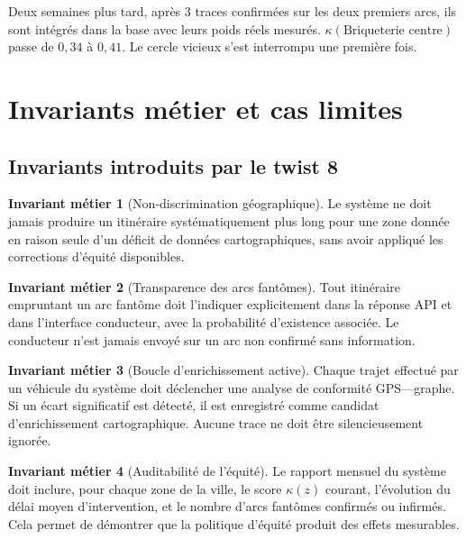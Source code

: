 \documentclass[12pt,a4paper]{article}
\theoremstyle{definition}
\newtheorem{invariant}{Invariant métier}[section]
\theoremstyle{remark}
\begin{document}
Deux semaines plus tard, après 3 traces confirmées sur les deux premiers
arcs, ils sont intégrés dans la base avec leurs poids réels mesurés.
$\kappa(\text{Briqueterie centre})$ passe de $0{,}34$ à $0{,}41$.
Le cercle vicieux s'est interrompu une première fois.

\newpage

\section{Invariants métier et cas limites}

\subsection{Invariants introduits par le twist 8}

\begin{invariant}[Non-discrimination géographique]
Le système ne doit jamais produire un itinéraire systématiquement
plus long pour une zone donnée en raison seule d'un déficit de
données cartographiques, sans avoir appliqué les corrections d'équité
disponibles.
\end{invariant}

\begin{invariant}[Transparence des arcs fantômes]
Tout itinéraire empruntant un arc fantôme doit l'indiquer
explicitement dans la réponse API et dans l'interface conducteur,
avec la probabilité d'existence associée. Le conducteur n'est
jamais envoyé sur un arc non confirmé sans information.
\end{invariant}

\begin{invariant}[Boucle d'enrichissement active]
Chaque trajet effectué par un véhicule du système doit déclencher
une analyse de conformité GPS---graphe. Si un écart significatif
est détecté, il est enregistré comme candidat d'enrichissement
cartographique. Aucune trace ne doit être silencieusement ignorée.
\end{invariant}

\begin{invariant}[Auditabilité de l'équité]
Le rapport mensuel du système doit inclure, pour chaque zone de
la ville, le score $\kappa(z)$ courant, l'évolution du délai moyen
d'intervention, et le nombre d'arcs fantômes confirmés ou infirmés.
Cela permet de démontrer que la politique d'équité produit des effets
mesurables.
\end{invariant}
\end{document}
